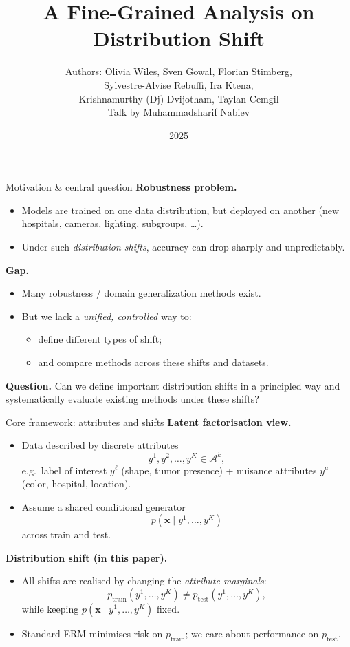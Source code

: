 \documentclass[10pt]{beamer}
\title{A Fine-Grained Analysis on Distribution Shift}
\author{
Authors: Olivia Wiles, Sven Gowal, Florian Stimberg,\\
Sylvestre-Alvise Rebuffi, Ira Ktena,\\
Krishnamurthy (Dj) Dvijotham, Taylan Cemgil\\[2mm]
\small Talk by Muhammadsharif Nabiev
}
\institute{Moscow Institute of Physics and Technology}
\date{2025}
\begin{document}
\begin{frame}
  \titlepage
\end{frame}

\begin{frame}{Motivation \& central question}
\textbf{Robustness problem.}
\begin{itemize}
  \item Models are trained on one data distribution, but deployed on another (new hospitals, cameras, lighting, subgroups, \dots).
  \item Under such \emph{distribution shifts}, accuracy can drop sharply and unpredictably.
\end{itemize}

\medskip
\textbf{Gap.}
\begin{itemize}
  \item Many robustness / domain generalization methods exist.
  \item But we lack a \emph{unified, controlled} way to:
  \begin{itemize}
    \item define different types of shift;
    \item and compare methods across these shifts and datasets.
  \end{itemize}
\end{itemize}

\medskip
\textbf{Question.}
Can we define important distribution shifts in a principled way and
systematically evaluate existing methods under these shifts?
\end{frame}

\begin{frame}{Core framework: attributes and shifts}
\textbf{Latent factorisation view.} 
\begin{itemize}
  \item Data described by discrete attributes
  \[
    y^1, y^2, \dots, y^K \in \mathcal{A}^k,
  \]
  e.g.\ label of interest $y^\ell$ (shape, tumor presence) + nuisance attributes $y^a$ (color, hospital, location).
  \item Assume a shared conditional generator
  \[
    p(\mathbf{x} \mid y^1,\dots,y^K)
  \]
  across train and test.
\end{itemize}

\medskip
\textbf{Distribution shift (in this paper).}
\begin{itemize}
  \item All shifts are realised by changing the \emph{attribute marginals}:
  \[
    p_{\text{train}}(y^1,\dots,y^K) \neq p_{\text{test}}(y^1,\dots,y^K),
  \]
  while keeping $p(\mathbf{x} \mid y^1,\dots,y^K)$ fixed.
  \item Standard ERM minimises risk on $p_{\text{train}}$; we care about performance on $p_{\text{test}}$.
\end{itemize}
\end{frame}
\end{document}
